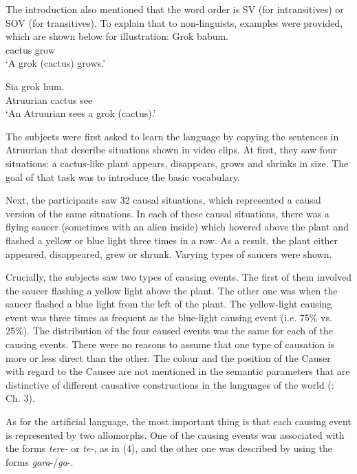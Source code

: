 \documentclass[output=paper]{langsci/langscibook}
\begin{document}
The introduction also mentioned that the word order is SV (for intransitives) or SOV (for transitives). To explain that to non-linguists, examples were provided, which are shown below for illustration: 
\newpage
\ea\label{ex:levshina:2} 
\gll Grok         babum.\\
     cactus      grow\\
\glt ‘A grok (cactus) grows.'      
\z

\ea\label{ex:levshina:3}
\gll Sia                 grok            hum.\\
     Atruurian      cactus        see\\
\glt ‘An Atruurian sees a grok (cactus).'
\z

The subjects were first asked to learn the language by copying the sentences in Atruurian that describe situations shown in video clips. At first, they saw four situations: a cactus-like plant appears, disappears, grows and shrinks in size. The goal of that task was to introduce the basic vocabulary. 

Next, the participants saw 32 causal situations, which represented a causal version of the same situations. In each of these causal situations, there was a flying saucer (sometimes with an alien inside) which hovered above the plant and flashed a yellow or blue light three times in a row. As a result, the plant either appeared, disappeared, grew or shrunk. Varying types of saucers were shown. 

Crucially, the subjects saw two types of causing events. The first of them involved the saucer flashing a yellow light above the plant. The other one was when the saucer flashed a blue light from the left of the plant. The yellow-light causing event was three times as frequent as the blue-light causing event (i.e. 75\% vs. 25\%). The distribution of the four caused events was the same for each of the causing events. There were no reasons to assume that one type of causation is more or less direct than the other. The colour and the position of the Causer with regard to the Causee are not mentioned in the semantic parameters that are distinctive of different causative constructions in the languages of the world (\citealt{Levshina2018_Effic}: Ch. 3). 

As for the artificial language, the most important thing is that each causing event is represented by two allomorphs. One of the causing events was associated with the forms \textit{tere-} or \textit{te-}, as in (4), and the other one was described by using the forms \textit{gara}{}-/\textit{ga}{}-.
\end{document}
